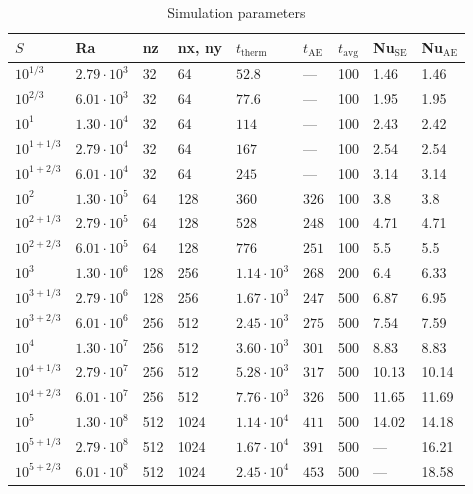 \documentclass[aps, pre, onecolumn, nofootinbib, notitlepage, groupedaddress, amsfonts, amssymb, amsmath, longbibliography]{revtex4-1}
\begin{document}
\begin{table}
\caption{Simulation parameters}
\label{table:run_parameters}
\begin{center}
\begin{tabularx}{\textwidth}{ X X X X | X X X | X X }
\hline																	
$S$	&	Ra	&	nz	&	nx, ny	&	$t_{\text{therm}}$	&	$t_{\text{AE}}$	&	$t_{\text{avg}}$	&	Nu$_{\text{SE}}$	&	Nu$_{\text{AE}}$	\\
\hline																	
$10^{1/3}$	&	$2.79 \cdot 10^3$	&	32	&	64	&	$52.8$	&	---	&	100	&	1.46	&	1.46	\\
$10^{2/3}$	&	$6.01 \cdot 10^3$	&	32	&	64	&	$77.6$	&	---	&	100	&	1.95	&	1.95	\\
$10^1$	&	$1.30 \cdot 10^4$	&	32	&	64	&	$114$	&	---	&	100	&	2.43	&	2.42	\\
$10^{1 + 1/3}$	&	$2.79 \cdot 10^4$	&	32	&	64	&	$167$	&	---	&	100	&	2.54	&	2.54	\\
$10^{1 + 2/3}$	&	$6.01 \cdot 10^4$	&	32	&	64	&	$245$	&	---	&	100	&	3.14	&	3.14	\\
$10^2$	&	$1.30 \cdot 10^5$	&	64	&	128	&	$360$	&	$326$	&	100	&	3.8	&	3.8	\\
$10^{2 + 1/3}$	&	$2.79 \cdot 10^5$	&	64	&	128	&	$528$	&	$248$	&	100	&	4.71	&	4.71	\\
$10^{2 + 2/3}$	&	$6.01 \cdot 10^5$	&	64	&	128	&	$776$	&	$251$	&	100	&	5.5	&	5.5	\\
$10^3$	&	$1.30 \cdot 10^6$	&	128	&	256	&	$1.14 \cdot 10^3$	&	$268$	&	200	&	6.4	&	6.33	\\
$10^{3 + 1/3}$	&	$2.79 \cdot 10^6$	&	128	&	256	&	$1.67 \cdot 10^3$	&	$247$	&	500	&	6.87	&	6.95	\\
$10^{3 + 2/3}$	&	$6.01 \cdot 10^6$	&	256	&	512	&	$2.45 \cdot 10^3$	&	$275$	&	500	&	7.54	&	7.59	\\
$10^4$	&	$1.30 \cdot 10^7$	&	256	&	512	&	$3.60 \cdot 10^3$	&	$301$	&	500	&	8.83	&	8.83	\\
$10^{4 + 1/3}$	&	$2.79 \cdot 10^7$	&	256	&	512	&	$5.28 \cdot 10^3$	&	$317$	&	500	&	10.13	&	10.14	\\
$10^{4 + 2/3}$	&	$6.01 \cdot 10^7$	&	256	&	512	&	$7.76 \cdot 10^3$	&	$326$	&	500	&	11.65	&	11.69	\\
$10^5$	&	$1.30 \cdot 10^8$	&	512	&	1024	&	$1.14 \cdot 10^4$	&	$411$	&	500	&	14.02	&	14.18	\\
$10^{5 + 1/3}$	&	$2.79 \cdot 10^8$	&	512	&	1024	&	$1.67 \cdot 10^4$	&	$391$	&	500	&	---	&	16.21	\\
$10^{5 + 2/3}$	&	$6.01 \cdot 10^8$	&	512	&	1024	&	$2.45 \cdot 10^4$	&	$453$	&	500	&	---	&	18.58	\\

\end{tabularx}
\end{center}
\end{table}
\end{document}
